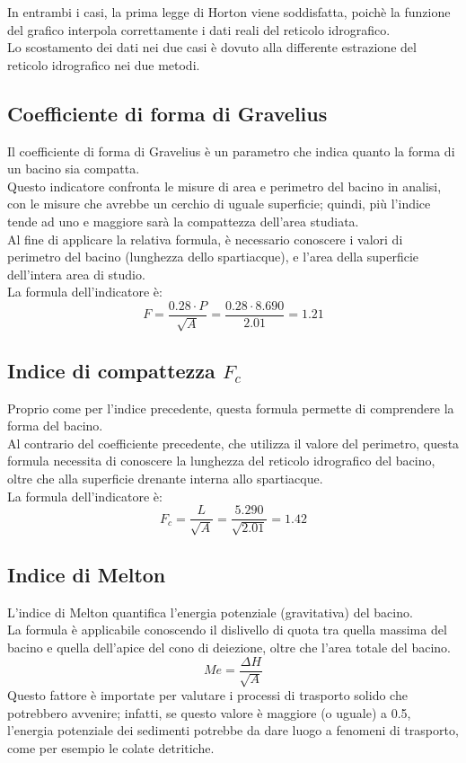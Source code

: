 \vspace{1cm}
In entrambi i casi, la prima legge di Horton viene soddisfatta, poichè la funzione del grafico interpola correttamente i dati reali del reticolo idrografico.\\
Lo scostamento dei dati nei due casi è dovuto alla differente estrazione del reticolo idrografico nei due metodi.

\subsection{Coefficiente di forma di Gravelius}
Il coefficiente di forma di Gravelius è un parametro che indica quanto la forma di un bacino sia compatta.\\
Questo indicatore confronta le misure di area e perimetro del bacino in analisi, con le misure che avrebbe un cerchio di uguale superficie; quindi, più l'indice tende ad uno e maggiore sarà la compattezza dell'area studiata.\\
Al fine di applicare la relativa formula, è necessario conoscere i valori di perimetro del bacino (lunghezza dello spartiacque), e l'area della superficie dell'intera area di studio.\\
La formula dell'indicatore è:
\begin{equation}
    F = \frac{0.28 \cdot P}{\sqrt{A}} = \frac{0.28 \cdot 8.690}{2.01} = 1.21
    \label{gravelius}
\end{equation}

\subsection{Indice di compattezza $F_c$}
Proprio come per l'indice precedente, questa formula permette di comprendere la forma del bacino.\\
Al contrario del coefficiente precedente, che utilizza il valore del perimetro, questa formula necessita di conoscere la lunghezza del reticolo idrografico del bacino, oltre che alla superficie drenante interna allo spartiacque.\\
La formula dell'indicatore è:
\begin{equation}
    F_c = \frac{L}{\sqrt{A}} = \frac{5.290}{\sqrt{2.01}} = 1.42
    \label{compatezza}
\end{equation}

\subsection{Indice di Melton}
L'indice di Melton quantifica l'energia potenziale (gravitativa) del bacino.\\
La formula è applicabile conoscendo il dislivello di quota tra quella massima del bacino e quella dell'apice del cono di deiezione, oltre che l'area totale del bacino. 
\begin{equation}
    Me = \frac{\Delta H}{\sqrt{A}}
    \label{melton}
\end{equation}
Questo fattore è importate per valutare i processi di trasporto solido che potrebbero avvenire; infatti, se questo valore è maggiore (o uguale) a 0.5, l'energia potenziale dei sedimenti potrebbe da dare luogo a fenomeni di trasporto, come per esempio le colate detritiche.

